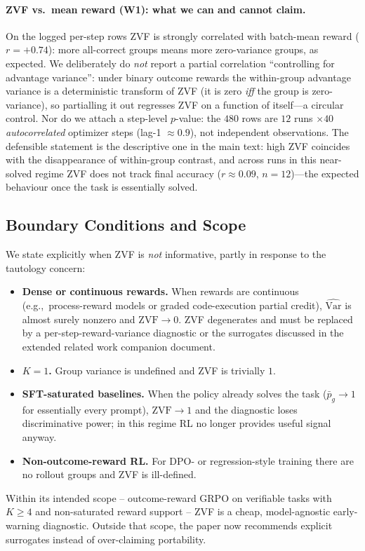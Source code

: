 \paragraph{ZVF vs.\ mean reward (W1): what we can and cannot claim.} On the
logged per-step rows ZVF is strongly correlated with batch-mean reward
($r=+0.74$): more all-correct groups means more zero-variance groups, as
expected. We deliberately do \emph{not} report a partial correlation
``controlling for advantage variance'': under binary outcome rewards the
within-group advantage variance is a deterministic transform of ZVF (it is zero
\emph{iff} the group is zero-variance), so partialling it out regresses ZVF on a
function of itself---a circular control. Nor do we attach a step-level
$p$-value: the $480$ rows are $12$ runs $\times 40$ \emph{autocorrelated}
optimizer steps (lag-1 $\approx 0.9$), not independent observations. The
defensible statement is the descriptive one in the main text: high ZVF coincides
with the disappearance of within-group contrast, and across runs in this
near-solved regime ZVF does not track final accuracy ($r\approx 0.09$,
$n{=}12$)---the expected behaviour once the task is essentially solved.

\subsection{Boundary Conditions and Scope}

We state explicitly when ZVF is \emph{not} informative, partly in response
to the tautology concern:
\begin{itemize}[leftmargin=1.2em,itemsep=0pt]
  \item \textbf{Dense or continuous rewards.} When rewards are continuous
        (e.g.,~process-reward models or graded code-execution partial credit),
        $\widehat{\mathrm{Var}}$ is almost surely nonzero and
        $\mathrm{ZVF} \to 0$. ZVF degenerates and must be replaced by a
        per-step-reward-variance diagnostic or the surrogates discussed in
        the extended related work companion document.
  \item \textbf{$K=1$.} Group variance is undefined and ZVF is trivially $1$.
  \item \textbf{SFT-saturated baselines.} When the policy already solves
        the task ($\bar p_g \to 1$ for essentially every prompt),
        $\mathrm{ZVF} \to 1$ and the diagnostic loses discriminative power;
        in this regime RL no longer provides useful signal anyway.
  \item \textbf{Non-outcome-reward RL.} For DPO- or regression-style
        training there are no rollout groups and ZVF is ill-defined.
\end{itemize}
Within its intended scope -- outcome-reward GRPO on verifiable tasks with
$K \ge 4$ and non-saturated reward support -- ZVF is a cheap, model-agnostic
early-warning diagnostic. Outside that scope, the paper now recommends
explicit surrogates instead of over-claiming portability.
